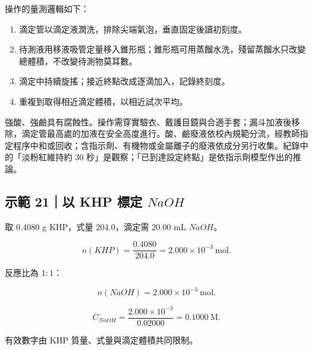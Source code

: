 \documentclass[11pt,a4paper]{article}
\providecommand{\tightlist}{%
  \setlength{\itemsep}{0pt}\setlength{\parskip}{0pt}}
\begin{document}
操作的量測邏輯如下：

\begin{enumerate}
\def\labelenumi{\arabic{enumi}.}
\tightlist
\item
  滴定管以滴定液潤洗，排除尖端氣泡，垂直固定後讀初刻度。
\item
  待測液用移液吸管定量移入錐形瓶；錐形瓶可用蒸餾水洗，殘留蒸餾水只改變總體積，不改變待測物莫耳數。
\item
  滴定中持續旋搖；接近終點改成逐滴加入，記錄終刻度。
\item
  重複到取得相近滴定體積，以相近試次平均。
\end{enumerate}

強酸、強鹼具有腐蝕性。操作需穿實驗衣、戴護目鏡與合適手套；漏斗加液後移除，滴定管最高處的加液在安全高度進行。酸、鹼廢液依校內規範分流，經教師指定程序中和或回收；含指示劑、有機物或金屬離子的廢液依成分另行收集。紀錄中的「淡粉紅維持約 30 秒」是觀察；「已到達設定終點」是依指示劑模型作出的推論。

\begin{HandoutWorkedExample}

\subsection{\texorpdfstring{示範 21｜以 KHP 標定 \(NaOH\)}{示範 21｜以 KHP 標定 NaOH}}\label{ux793aux7bc4-21ux4ee5-khp-ux6a19ux5b9a-naoh}

取 \(0.4080\) g KHP，式量 \(204.0\)，滴定需 \(20.00\) mL \(NaOH\)。

\[
n(KHP)=\frac{0.4080}{204.0}=2.000\times10^{-3}\ \mathrm{mol}.
\]

反應比為 \(1:1\)：

\[
n(NaOH)=2.000\times10^{-3}\ \mathrm{mol}.
\]

\[
C_{NaOH}=\frac{2.000\times10^{-3}}{0.02000}
=0.1000\ \mathrm M.
\]

有效數字由 KHP 質量、式量與滴定體積共同限制。

\end{HandoutWorkedExample}
\end{document}
